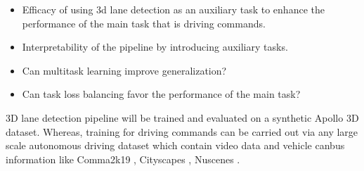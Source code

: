     \begin{itemize}
 \item Efficacy of using 3d lane detection as an auxiliary task to enhance the performance of the main task that is driving commands.
\item Interpretability of the pipeline by introducing auxiliary tasks. 
\item Can multitask learning improve generalization? 
\item Can task loss balancing favor the performance of the main task?  
\end{itemize}

3D lane detection pipeline will be trained and evaluated on a synthetic Apollo 3D \cite{guo2020gen} dataset. Whereas, training for driving commands can be carried out via any large scale autonomous driving dataset which contain video data and vehicle canbus information like Comma2k19 \cite{1812.05752},  Cityscapes \cite{DBLP:journals/corr/CordtsORREBFRS16}, Nuscenes \cite{DBLP:journals/corr/abs-1903-11027}.

